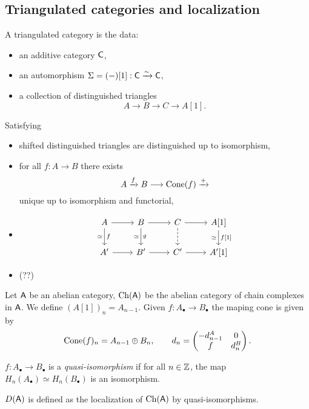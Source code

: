 \subsection{Triangulated categories and localization}
\begin{definition}
	A triangulated category is the data:
	\begin{itemize}
		\item an additive category $\mathsf{C}$,
		\item an automorphism $\Sigma=(-)[1]:\mathsf{C}\xrightarrow{\sim} \mathsf{C}$,
		\item a collection of distinguished triangles
			\[
				A \to B \to C \to A[1]
			.\] 
	\end{itemize}
	Satisfying
	\begin{itemize}
		\item shifted distinguished triangles are distinguished up to isomorphism,
		\item for all $f:A\to B$ there exists
			\[
				A \xrightarrow{f} B \to \Cone(f) \xrightarrow{+}
			\] 
			unique up to isomorphism and functorial,
		\item 
			\begin{equation*}
			\begin{tikzcd}
				A \ar[r] \ar[d,"f","\simeq"'] & B \ar[r] \ar[d,"g","\simeq"'] & C \ar[d,dashed] \ar[r] & A[1] \ar[d,"{f[1]}","\simeq"'] \\
				A' \ar[r] & B' \ar[r] & C' \ar[r] & A'[1]
			\end{tikzcd}
			\end{equation*}	
		\item (??)
	\end{itemize}
\end{definition}

\begin{example}
	Let $\mathsf{A}$ be an abelian category, $\operatorname{Ch}(\mathsf{A})$ be the abelian category of chain complexes in $\mathsf{A}$. We define $(A[1])_n = A_{n-1}$. Given $f:A_\bullet\to B_\bullet$ the maping cone is given by
	\[
		\operatorname{Cone}(f)_n = A_{n-1} \oplus B_n,\qquad d_n = \begin{pmatrix} -d_{n-1}^{A} & 0 \\ f & d_n^{B} \end{pmatrix} 
	.\] 
\end{example}
\begin{definition}
	$f:A_\bullet\to B_\bullet$ is a \emph{quasi-isomorphism} if for all $n\in \mathbb Z$, the map $H_n(A_\bullet)\simeq H_n(B_\bullet)$ is an isomorphism.
\end{definition}
\begin{definition}
	$D(\mathsf{A})$ is defined as the localization of $\operatorname{Ch}(\mathsf{A})$ by quasi-isomorphisms.
\end{definition}

